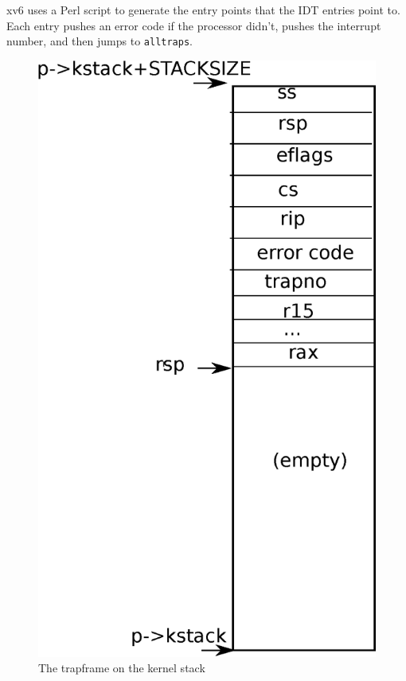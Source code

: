 xv6 uses a Perl script
to generate the entry points that the IDT entries point to.
Each entry pushes an error code
if the processor didn't, pushes the interrupt number, and then
jumps to
\lstinline{alltraps}.

\begin{figure}[t]
\center
\includegraphics[scale=0.5]{fig/trapframe.eps}
\caption{The trapframe on the kernel stack}
\label{fig:trapframe}
\end{figure}

